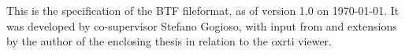 \newpage
\appendix
This is the specification of the BTF fileformat, as of version 1.0 on \today.
It was developed by co-supervisor Stefano Gogioso, with input from and extensions by
the author of the enclosing thesis in relation to the oxrti viewer.

\newpage
\printbibliography
